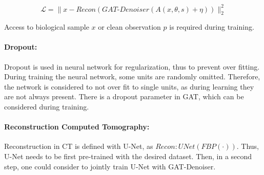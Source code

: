 \begin{equation}
  \label{eq:loss_reco}
  \mathcal{L} = \parallel x - \textit{Recon} ( \textit{GAT-Denoiser}(A(x, \theta, s) + \eta)) \parallel ^2_2
\end{equation}

Access to biological sample $x$ or clean observation $p$ is required during training.

\paragraph{Dropout:}
Dropout is used in neural network for regularization, thus to prevent over fitting. 
During training the neural network, some units are randomly omitted. Therefore, the network is 
considered to not over fit to single units, as during learning they are not always present.
There is a dropout parameter in GAT, which can be considered during training. 


\paragraph{Reconstruction Computed Tomography:}
Reconstruction in CT is defined with U-Net, as $\textit{Recon} : \textit{UNet} \left( \textit{FBP} \left( \cdot \right) \right)$.
Thus, U-Net needs to be first pre-trained with the desired dataset.
Then, in a second step, one could consider to jointly train U-Net with GAT-Denoiser.